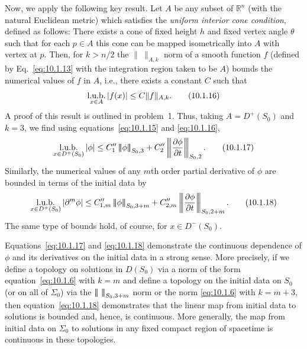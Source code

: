 Now, we apply the following key result. Let \(A\) be any subset of \(\mathbb R^n\)
(with the natural Euclidean metric) which satisfies the \emph{uniform interior cone
condition}, defined as follows: There exists a cone of fixed height \(h\) and fixed
vertex angle \(\theta\) such that for each \(p\in A\) this cone can be mapped
isometrically into \(A\) with vertex at \(p\). Then, for \(k>n/2\) the
\(\lVert\ \rVert_{A,k}\) norm of a smooth function \(f\) (defined by
Eq.~\eqref{eq:10.1.13} with the integration region taken to be \(A\)) bounds the
numerical values of \(f\) in \(A\), i.e., there exists a constant \(C\) such that
\begin{equation}
  {\mathop{\rm l.u.b.}_{x\in A}}\,|f(x)|\leq C\lVert f\rVert_{A,k}.
  \tag{10.1.16}\label{eq:10.1.16}
\end{equation}
A proof of this result is outlined in problem~1. Thus, taking \(A=D^+(S_0)\) and
\(k=3\), we find using equations~\eqref{eq:10.1.15} and \eqref{eq:10.1.16},
\begin{equation}
  {\mathop{\rm l.u.b.}_{x\in D^+(S_0)}}\,|\phi|
  \leq C''_1\triplenorm{\phi}_{S_0,3}
  +C''_2\triplenorm{\frac{\partial\phi}{\partial t}}_{S_0,2}.
  \tag{10.1.17}\label{eq:10.1.17}
\end{equation}
Similarly, the numerical values of any \(m\)th order partial derivative of \(\phi\)
are bounded in terms of the initial data by
\begin{equation}
  {\mathop{\rm l.u.b.}_{x\in D^+(S_0)}}\,|\partial^m\phi|
  \leq C''_{1,m}\triplenorm{\phi}_{S_0,3+m}
  +C''_{2,m}\triplenorm{\frac{\partial\phi}{\partial t}}_{S_0,2+m}.
  \tag{10.1.18}\label{eq:10.1.18}
\end{equation}
The same type of bounds hold, of course, for \(x\in D^-(S_0)\).

Equations~\eqref{eq:10.1.17} and \eqref{eq:10.1.18} demonstrate the continuous
dependence of \(\phi\) and its derivatives on the initial data in a strong sense. More
precisely, if we define a topology on solutions in \(D(S_0)\) via a norm of the form
equation~\eqref{eq:10.1.6} with \(k=m\) and define a topology on the initial data
on \(S_0\) (or on all of \(\Sigma_0\)) via the
\(\left\lvert\!\left\lvert\!\left\lvert \  \right\rvert\!\right\rvert\!\right\rvert_{S_0,3+m}\) norm or the norm
\eqref{eq:10.1.6} with \(k=m+3\), then equation~\eqref{eq:10.1.18}
demonstrates that the linear map from initial data to solutions is bounded and, hence,
is continuous. More generally, the map from initial data on \(\Sigma_0\) to solutions
in any fixed compact region of spacetime is continuous in these topologies.

